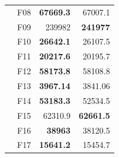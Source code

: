 \begin{table}[]
\begin{tabular}{ll|r|r|}
\multicolumn{1}{|l|}{\cellcolor[HTML]{ECF4FF}}                           & \cellcolor[HTML]{FCE6AB}F08     & \cellcolor[HTML]{D3FFB6}\textbf{67669.3}                       & 67007.1                                                   \\ \cline{2-4} 
\multicolumn{1}{|l|}{\cellcolor[HTML]{ECF4FF}}                           & \cellcolor[HTML]{FCE6AB}F09     & 239982                                                         & \cellcolor[HTML]{D3FFB6}\textbf{241977}                   \\ \cline{2-4} 
\multicolumn{1}{|l|}{\cellcolor[HTML]{ECF4FF}}                           & \cellcolor[HTML]{FCE6AB}F10     & \cellcolor[HTML]{D3FFB6}\textbf{26642.1}                       & 26107.5                                                   \\ \cline{2-4} 
\multicolumn{1}{|l|}{\cellcolor[HTML]{ECF4FF}}                           & \cellcolor[HTML]{FCE6AB}F11     & \cellcolor[HTML]{D3FFB6}\textbf{20217.6}                       & 20195.7                                                   \\ \cline{2-4} 
\multicolumn{1}{|l|}{\cellcolor[HTML]{ECF4FF}}                           & \cellcolor[HTML]{FCE6AB}F12     & \cellcolor[HTML]{D3FFB6}\textbf{58173.8}                       & 58108.8                                                   \\ \cline{2-4} 
\multicolumn{1}{|l|}{\cellcolor[HTML]{ECF4FF}}                           & \cellcolor[HTML]{FCE6AB}F13     & \cellcolor[HTML]{D3FFB6}\textbf{3967.14}                       & 3841.06                                                   \\ \cline{2-4} 
\multicolumn{1}{|l|}{\cellcolor[HTML]{ECF4FF}}                           & \cellcolor[HTML]{FCE6AB}F14     & \cellcolor[HTML]{D3FFB6}\textbf{53183.3}                       & 52534.5                                                   \\ \cline{2-4} 
\multicolumn{1}{|l|}{\cellcolor[HTML]{ECF4FF}}                           & \cellcolor[HTML]{FCE6AB}F15     & 62310.9                                                        & \cellcolor[HTML]{D3FFB6}\textbf{62661.5}                  \\ \cline{2-4} 
\multicolumn{1}{|l|}{\cellcolor[HTML]{ECF4FF}}                           & \cellcolor[HTML]{FCE6AB}F16     & \cellcolor[HTML]{D3FFB6}\textbf{38963}                         & 38120.5                                                   \\ \cline{2-4} 
\multicolumn{1}{|l|}{\cellcolor[HTML]{ECF4FF}}                           & \cellcolor[HTML]{FCE6AB}F17     & \cellcolor[HTML]{D3FFB6}\textbf{15641.2}                       & 15454.7                                                   \\ \cline{2-4} 

\end{tabular}
\end{table}
